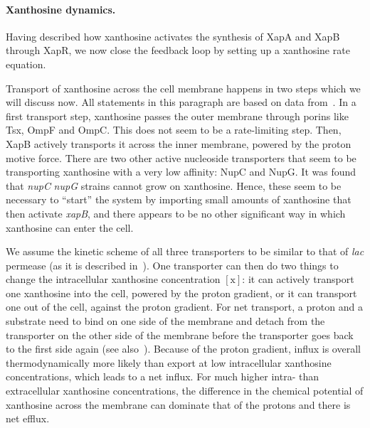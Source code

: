 \documentclass[10pt,letterpaper]{article}
\newcommand{\n}[1]{\mathrm{#1}}
\begin{document}
\paragraph*{Xanthosine dynamics.}
Having described how xanthosine activates the synthesis of XapA and
XapB through XapR, we now close the feedback loop
by setting up a xanthosine rate equation.

Transport of xanthosine across the cell membrane happens in two steps which
we will discuss now. All statements in this paragraph are based on data
from~\cite{Norholm2001}. In a first transport step, xanthosine passes the
outer membrane through porins like Tsx, OmpF and OmpC. This does not seem to
be a rate-limiting step. Then, XapB actively transports it across the inner
membrane, powered by the proton motive force. There are two other active
nucleoside transporters that seem to be transporting xanthosine with a very
low affinity: NupC and NupG. It was found that \textDelta\emph{nupC}
\textDelta\emph{nupG} strains cannot grow on xanthosine. Hence, these seem
to be necessary to ``start'' the system by importing small amounts of
xanthosine that then activate \emph{xapB}, and there appears to be no other
significant way in which xanthosine can enter the cell.

We assume the kinetic scheme of all three transporters to be similar to that
of \emph{lac} permease (as it is described in~\cite{Kaback2015}). One
transporter can then do two things to change the intracellular xanthosine
concentration $\n{[x]}$: it can actively transport one xanthosine into the
cell, powered by the proton gradient, or it can transport one out of the
cell, against the proton gradient. For net transport, a proton and a
substrate need to bind on one side of the membrane and detach from the
transporter on the other side of the membrane before the transporter goes
back to the first side again (see also~). Because of the
proton gradient, influx is overall thermodynamically more likely than export
at low intracellular xanthosine concentrations, which leads to a net influx.
For much higher intra- than extracellular xanthosine concentrations, the
difference in the chemical potential of xanthosine across the membrane can
dominate that of the protons and there is net efflux. 
\end{document}
